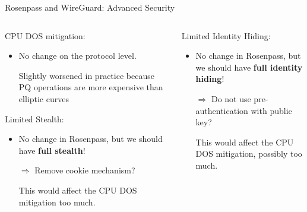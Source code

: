 \begin{frame}{Rosenpass and WireGuard: Advanced Security}
\hypertarget{wireguard-advanced-security-properties}{}
\vspace*{-\baselineskip}
\small
\begin{columns}[fullwidth,T]
	\setlength{}
  \begin{column}{.48\linewidth}
    \begin{block}{\strut CPU DOS mitigation:}
    \begin{itemize}
      \item No change on the protocol level.
      \item[{\Sey[][green!60!white]} ] Slightly worsened in practice because PQ operations are more expensive than elliptic curves
    \end{itemize}
        \unskip
    \end{block}
    \begin{block}{\strut Limited Stealth:}
    \begin{itemize}
      \item No change in Rosenpass, but we should have \textbf{full stealth}!
      \item[$\Rightarrow$] Remove cookie mechanism?
      \item[{\Sey[][green!60!white]} ] This would affect the CPU DOS mitigation too much.
    \end{itemize}
    \unskip
    \end{block}

  \end{column}

  \begin{column}{.48\linewidth}
    \begin{block}{\strut Limited Identity Hiding:}
    \begin{itemize}
      \item No change in Rosenpass, but we should have \textbf{full identity hiding}!
      \item[$\Rightarrow$] Do not use pre-authentication with public key?
      \item[{\Sey[][green!60!white]} ] This would affect the CPU DOS mitigation, possibly too much.
    \end{itemize}
        \unskip
    \end{block}
  \end{column}
\end{columns}
\end{frame}

